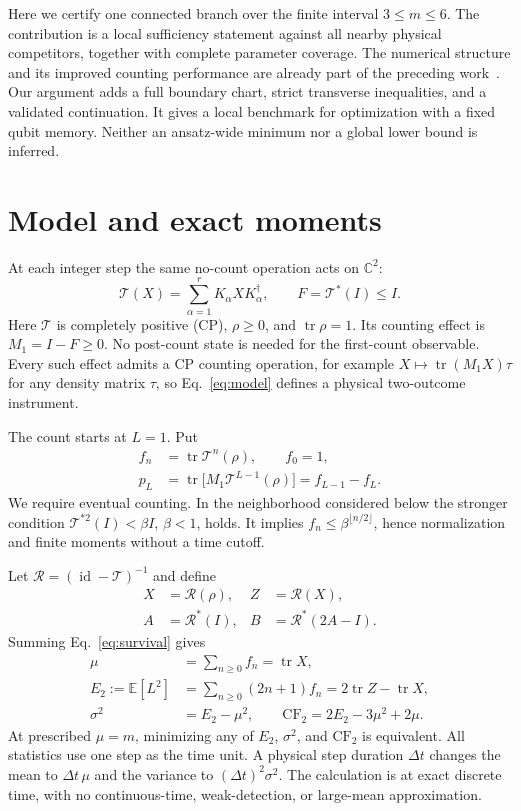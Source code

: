\documentclass[aps,pra,reprint,amsmath,amssymb,longbibliography]{revtex4-2}
\newcommand{\tr}{\operatorname{tr}}
\newcommand{\id}{\operatorname{id}}
\newcommand{\T}{\mathcal T}
\newcommand{\R}{\mathcal R}
\newcommand{\E}{\mathbb E}
\newcommand{\CF}{\mathrm{CF}_2}
\begin{document}
Here we certify one connected branch over the finite interval $3\le m\le6$. The contribution is a local sufficiency statement against all nearby physical competitors, together with complete parameter coverage. The numerical structure and its improved counting performance are already part of the preceding work~\cite{Olamaei2026}. Our argument adds a full boundary chart, strict transverse inequalities, and a validated continuation. It gives a local benchmark for optimization with a fixed qubit memory. Neither an ansatz-wide minimum nor a global lower bound is inferred.

\section{Model and exact moments}\label{sec:model}
At each integer step the same no-count operation acts on $\mathbb C^2$:
\begin{equation}
 \T(X)=\sum_{\alpha=1}^{r}K_\alpha X K_\alpha^\dagger,
 \qquad F=\T^*(I)\le I.\label{eq:model}
\end{equation}
Here $\T$ is completely positive (CP), $\rho\ge0$, and $\tr\rho=1$. Its counting effect is $M_1=I-F\ge0$. No post-count state is needed for the first-count observable. Every such effect admits a CP counting operation, for example $X\mapsto\tr(M_1X)\tau$ for any density matrix $\tau$, so Eq.~\eqref{eq:model} defines a physical two-outcome instrument.

The count starts at $L=1$. Put
\begin{align}
 f_n&=\tr\T^n(\rho),\qquad f_0=1,\nonumber\\
 p_L&=\tr\bigl[M_1\T^{L-1}(\rho)\bigr]=f_{L-1}-f_L.\label{eq:survival}
\end{align}
We require eventual counting. In the neighborhood considered below the stronger condition $\T^{*2}(I)<\beta I$, $\beta<1$, holds. It implies $f_n\le\beta^{\lfloor n/2\rfloor}$, hence normalization and finite moments without a time cutoff.

Let $\R=(\id-\T)^{-1}$ and define
\begin{equation}
 \begin{aligned}
 X&=\R(\rho),& Z&=\R(X),\\
 A&=\R^*(I),& B&=\R^*(2A-I).
 \end{aligned}\label{eq:resolvents}
\end{equation}
Summing Eq.~\eqref{eq:survival} gives
\begin{align}
 \mu&=\sum_{n\ge0}f_n=\tr X,\nonumber\\
 E_2:=\E[L^2]&=\sum_{n\ge0}(2n+1)f_n=2\tr Z-\tr X,\label{eq:moments}\\
 \sigma^2&=E_2-\mu^2,\qquad
 \CF=2E_2-3\mu^2+2\mu.\label{eq:cf}
\end{align}
At prescribed $\mu=m$, minimizing any of $E_2$, $\sigma^2$, and $\CF$ is equivalent. All statistics use one step as the time unit. A physical step duration $\Delta t$ changes the mean to $\Delta t\,\mu$ and the variance to $(\Delta t)^2\sigma^2$. The calculation is at exact discrete time, with no continuous-time, weak-detection, or large-mean approximation.
\end{document}
